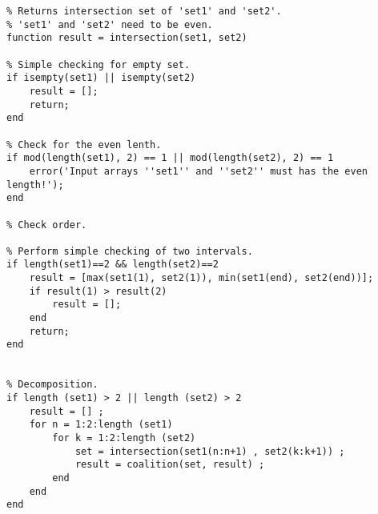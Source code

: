 \begin{verbatim}
% Returns intersection set of 'set1' and 'set2'.
% 'set1' and 'set2' need to be even.
function result = intersection(set1, set2)

% Simple checking for empty set.
if isempty(set1) || isempty(set2)
    result = [];
    return;
end

% Check for the even lenth.
if mod(length(set1), 2) == 1 || mod(length(set2), 2) == 1
    error('Input arrays ''set1'' and ''set2'' must has the even length!');
end

% Check order.

% Perform simple checking of two intervals.
if length(set1)==2 && length(set2)==2
    result = [max(set1(1), set2(1)), min(set1(end), set2(end))];
    if result(1) > result(2)
        result = [];
    end
    return;
end


% Decomposition.
if length (set1) > 2 || length (set2) > 2
    result = [] ;
    for n = 1:2:length (set1)
        for k = 1:2:length (set2)
            set = intersection(set1(n:n+1) , set2(k:k+1)) ;
            result = coalition(set, result) ;
        end
    end
end
\end{verbatim}